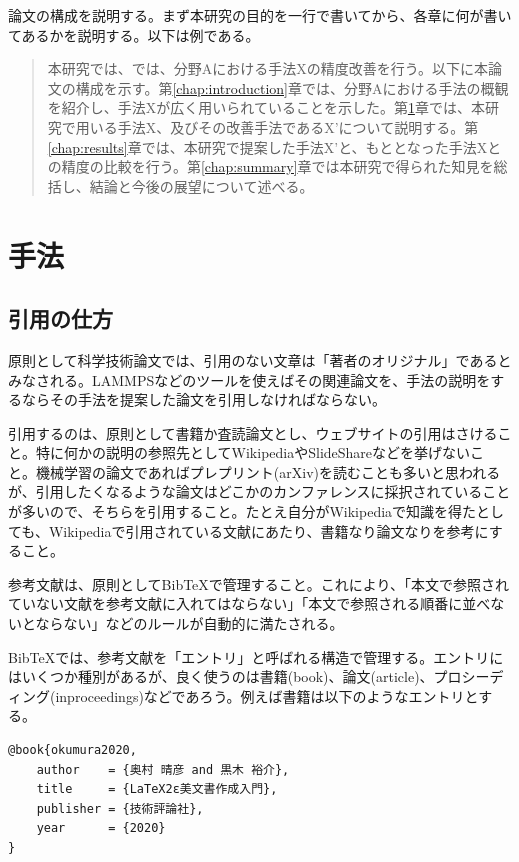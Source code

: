\documentclass[titlepage]{jsreport}
\begin{document}
論文の構成を説明する。まず本研究の目的を一行で書いてから、各章に何が書いてあるかを説明する。以下は例である。

\begin{quotation}
    本研究では、では、分野Aにおける手法Xの精度改善を行う。以下に本論文の構成を示す。第\ref{chap:introduction}章では、分野Aにおける手法の概観を紹介し、手法Xが広く用いられていることを示した。第\ref{chap:method}章では、本研究で用いる手法X、及びその改善手法であるX'について説明する。第\ref{chap:results}章では、本研究で提案した手法X'と、もととなった手法Xとの精度の比較を行う。第\ref{chap:summary}章では本研究で得られた知見を総括し、結論と今後の展望について述べる。
\end{quotation}

\chapter{手法} \label{chap:method}

\section{引用の仕方}

原則として科学技術論文では、引用のない文章は「著者のオリジナル」であるとみなされる。LAMMPSなどのツールを使えばその関連論文を、手法の説明をするならその手法を提案した論文を引用しなければならない。

引用するのは、原則として書籍か査読論文とし、ウェブサイトの引用はさけること。特に何かの説明の参照先としてWikipediaやSlideShareなどを挙げないこと。機械学習の論文であればプレプリント(arXiv)を読むことも多いと思われるが、引用したくなるような論文はどこかのカンファレンスに採択されていることが多いので、そちらを引用すること。たとえ自分がWikipediaで知識を得たとしても、Wikipediaで引用されている文献にあたり、書籍なり論文なりを参考にすること。

参考文献は、原則としてBibTeXで管理すること。これにより、「本文で参照されていない文献を参考文献に入れてはならない」「本文で参照される順番に並べないとならない」などのルールが自動的に満たされる。

BibTeXでは、参考文献を「エントリ」と呼ばれる構造で管理する。エントリにはいくつか種別があるが、良く使うのは書籍(book)、論文(article)、プロシーディング(inproceedings)などであろう。例えば書籍は以下のようなエントリとする。

\begin{lstlisting}[language=TeX]
@book{okumura2020,
    author    = {奥村 晴彦 and 黒木 裕介},
    title     = {LaTeX2ε美文書作成入門},
    publisher = {技術評論社},
    year      = {2020}
}
\end{lstlisting}
\end{document}
